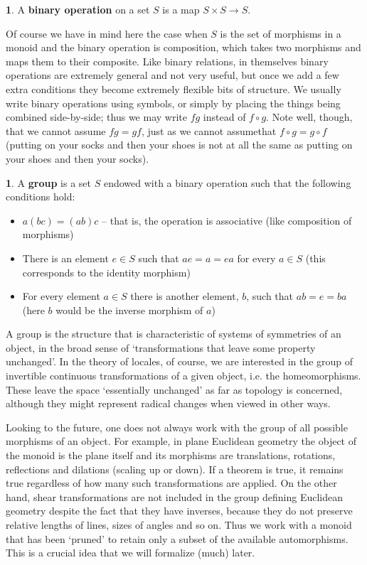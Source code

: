 \documentclass[oneside,english]{amsbook}
\numberwithin{section}{chapter}
\theoremstyle{plain}
\theoremstyle{definition}
\newtheorem{defn}[thm]{\protect\definitionname}
\providecommand{\definitionname}{Definition}
\begin{document}
\begin{defn}
	A \textbf{binary operation} on a set $S$ is a map $S\times S\to S$.
\end{defn}

Of course we have in mind here the case when $S$ is the set of morphisms in a monoid and the binary operation is composition, which takes two morphisms and maps them to their composite. Like binary relations, in themselves binary operations are extremely general and not very useful, but once we add a few extra conditions they become extremely flexible bits of structure. We usually write binary operations using symbols, or simply by placing the things being combined side-by-side; thus we may write $fg$ instead of $f\circ g$. Note well, though, that we cannot assume $fg=gf$, just as we cannot assumethat $f\circ g = g\circ f$ (putting on your socks and then your shoes is not at all the same as putting on your shoes and then your socks).

\begin{defn}A \textbf{group} is a set $S$ endowed with a binary operation such that the following conditions hold:
	\begin{itemize}
		\item{$a(bc)=(ab)c$ -- that is, the operation is associative (like composition of morphisms)}
		\item{There is an element $e\in S$ such that $ae = a = ea$ for every $a\in S$ (this corresponds to the identity morphism)}
		\item{For every element $a\in S$ there is another element, $b$, such that $ab = e = ba$ (here $b$ would be the inverse morphism of $a$)}
	\end{itemize}
\end{defn}

A group is the structure that is characteristic of systems of symmetries of an object, in the broad sense of `transformations that leave some property unchanged'. In the theory of locales, of course, we are interested in the group of invertible continuous transformations of a given object, i.e. the homeomorphisms. These leave the space `essentially unchanged' as far as topology is concerned, although they might represent radical changes when viewed in other ways.

Looking to the future, one does not always work with the group of all possible morphisms of an object. For example, in plane Euclidean geometry the object of the monoid is the plane itself and its morphisms are translations, rotations, reflections and dilations (scaling up or down). If a theorem is true, it remains true regardless of how many such transformations are applied. On the other hand, shear transformations are not included in the group defining Euclidean geometry despite the fact that they have inverses, because they do not preserve relative lengths of lines, sizes of angles and so on. Thus we work with a monoid that has been `pruned' to retain only a subset of the available automorphisms. This is a crucial idea that we will formalize (much) later.
\end{document}

